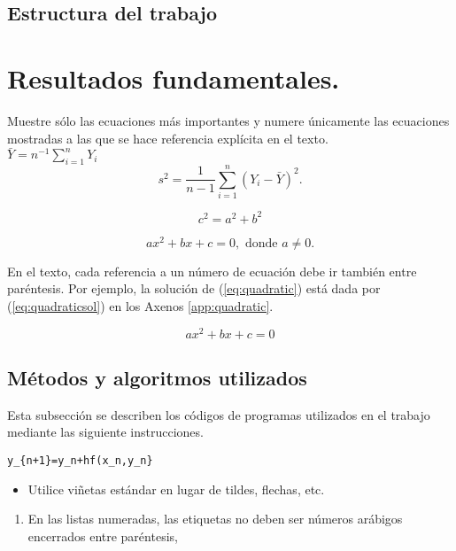 \documentclass{wscpaperproc}
\theoremstyle{wsc}
\begin{document}
\subsection{Estructura del trabajo}

\section{Resultados fundamentales.}

Muestre s\'olo las ecuaciones m\'as importantes y numere \'unicamente las ecuaciones mostradas a las que se hace referencia expl\'icita en el texto. \\

$\bar Y = n^{-1} \sum_{i=1}^n Y_i$\\
$$s^2 = \frac 1 {n-1} \sum_{i=1}^n (Y_i - \bar Y)^2.$$

\[
 c^2=a^2+b^2
\]

\begin{equation}\label{eq:quadratic}
ax^2 + bx + c = 0, \mbox{ donde } a \ne 0.
\end{equation}

En el texto, cada referencia a un n\'umero de ecuaci\'on debe ir tambi\'en entre par\'entesis. Por ejemplo, la soluci\'on de (\ref{eq:quadratic}) est\'a dada por  (\ref{eq:quadraticsol}) en los Axenos \ref{app:quadratic}.


\begin{equation} \label{eq:quadratic_second}
ax^2 + bx + c = 0
\end{equation}


\subsection{M\'etodos y algoritmos utilizados}
Esta  subsecci\'on se describen los c\'odigos de programas utilizados en el trabajo mediante las siguiente instrucciones.

\begin{verbatim}
y_{n+1}=y_n+hf(x_n,y_n}
\end{verbatim}


\begin{itemize}
	\item Utilice vi\~netas est\'andar en lugar de tildes, flechas, etc. \cite{bechhofer:heteroscedastic}
\end{itemize}
\begin{enumerate}
	\item En las listas numeradas, las etiquetas no deben ser n\'umeros ar\'abigos encerrados entre par\'entesis, \cite{simulation}
\end{enumerate}
\end{document}
